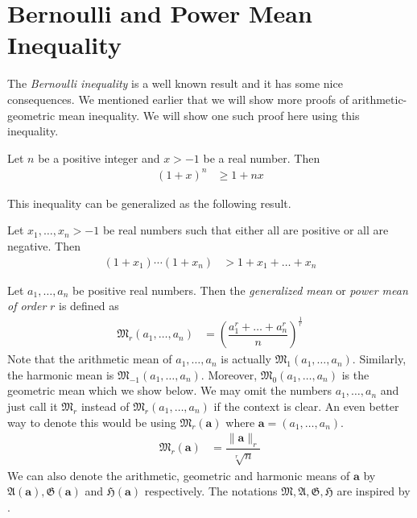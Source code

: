 \documentclass{subfile}
\begin{document}
	\section{Bernoulli and Power Mean Inequality}\label{sec:powermean}
	The \emph{Bernoulli inequality} is a well known result and it has some nice consequences. We mentioned earlier that we will show more proofs of arithmetic-geometric mean inequality. We will show one such proof here using this inequality.
		\begin{theorem}
			Let $n$ be a positive integer and $x>-1$ be a real number. Then
				\begin{align*}
					(1+x)^{n}
						& \geq1+nx
				\end{align*}
		\end{theorem}
	This inequality can be generalized as the following result.
		\begin{theorem}
			Let $x_{1},\ldots,x_{n}>-1$ be real numbers such that either all are positive or all are negative. Then
				\begin{align*}
					(1+x_{1})\cdots(1+x_{n})
						& > 1+x_{1}+\ldots+x_{n}
				\end{align*}
		\end{theorem}%
	
			Let $a_{1},\ldots,a_{n}$ be positive real numbers. Then the \emph{generalized mean} or \emph{power mean of order} $r$ is defined as
				\begin{align*}
					\mathfrak{M}_{r}(a_{1},\ldots,a_{n})
						& = \left(\dfrac{a_{1}^{r}+\ldots+a_{n}^{r}}{n}\right)^{\frac{1}{r}}
				\end{align*}
			Note that the arithmetic mean of $a_{1},\ldots,a_{n}$ is actually $\mathfrak{M}_{1}(a_{1},\ldots,a_{n})$. Similarly, the harmonic mean is $\mathfrak{M}_{-1}(a_{1},\ldots,a_{n})$. Moreover, $\mathfrak{M}_0(a_{1},\ldots,a_{n})$ is the geometric mean which we show below.
	We may omit the numbers $a_{1},\ldots,a_{n}$ and just call it $\mathfrak{M}_{r}$ instead of $\mathfrak{M}_{r}(a_{1},\ldots,a_{n})$ if the context is clear. An even better way to denote this would be using $\mathfrak{M}_{r}(\mathbf{a})$ where $\mathbf{a}=(a_{1},\ldots,a_{n})$.
		\begin{align*}
			\mathfrak{M}_{r}(\mathbf{a})
				& = \dfrac{\|\mathbf{a}\|_{r}}{\sqrt[r]{n}}
		\end{align*}
	We can also denote the arithmetic, geometric and harmonic means of $\mathbf{a}$ by $\mathfrak{A}(\mathbf{a}),\mathfrak{G}(\mathbf{a})$ and $\mathfrak{H}(\mathbf{a})$ respectively. The notations $\mathfrak{M},\mathfrak{A},\mathfrak{G},\mathfrak{H}$ are inspired by \textcite{hardy_littlewood_polya_1934}. 
	
\end{document}
